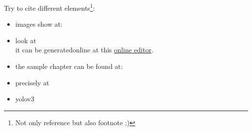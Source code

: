 Try to cite different elements\footnote{Not only reference but also footnote ;)}:
\begin{itemize}
	\item images show at: 
	\item look at \\
	it can be generatedonline at this \href{https://www.tablesgenerator.com/}{online editor}.
	\item the sample chapter can be found at: 
	\item precisely at 
	\item yolov3 \cite{yoloV3}
\end{itemize}

